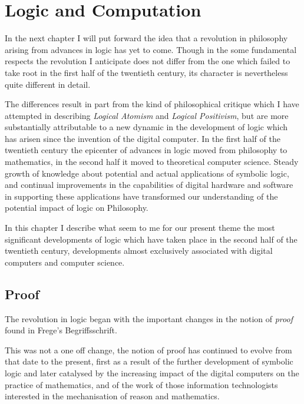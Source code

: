 \chapter{Logic and Computation}\label{LogicAndComputation}

In the next chapter I will put forward the idea that a revolution in philosophy arising from advances in logic has yet to come.
Though in the some fundamental respects the revolution I anticipate does not differ from the one which failed to take root in the first half of the twentieth century, its character is nevertheless quite different in detail.

The differences result in part from the kind of philosophical critique which I have attempted in describing {\it Logical Atomism} and {\it Logical Positivism}, but are more substantially attributable to a new dynamic in the development of logic which has arisen since the invention of the digital computer.
In the first half of the twentieth century the epicenter of advances in logic moved from philosophy to mathematics, in the second half it moved to theoretical computer science.
Steady growth of knowledge about potential and actual applications of symbolic logic, and continual improvements in the capabilities of digital hardware and software in supporting these applications have transformed our understanding of the potential impact of logic on Philosophy.

In this chapter I describe what seem to me for our present theme the most significant developments of logic which have taken place in the second half of the twentieth century, developments almost exclusively associated with digital computers and computer science.

\section{Proof}

The revolution in logic began with the important changes in the notion of {\it proof} found in Frege's Begriffsschrift.

This was not a one off change, the notion of proof has continued to evolve from that date to the present, first as a result of the further development of symbolic logic and later catalysed by the increasing impact of the digital computers on the practice of mathematics, and of the work of those information technologists interested in the mechanisation of reason and mathematics.

